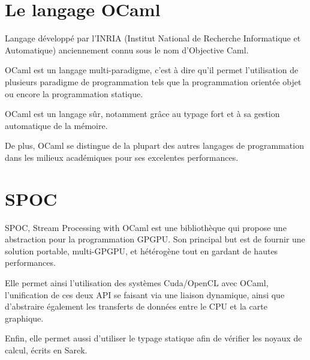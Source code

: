 \documentclass{report}
\begin{document}
\section{Le langage OCaml}
Langage développé par l'INRIA (Institut National de Recherche Informatique et Automatique) anciennement connu sous le nom d'Objective Caml.\newline

OCaml est un langage multi-paradigme, c'est à dire qu'il permet l'utilisation de plusieurs paradigme de programmation tels que la programmation orientée objet ou encore la programmation statique. 

OCaml est un langage sûr, notamment grâce au typage fort et à sa gestion automatique de la mémoire. 

De plus, OCaml se distingue de la plupart des autres langages de programmation dans les milieux académiques pour ses excelentes performances. 

\section{SPOC}
SPOC\cite{refSpoc}, Stream Processing with OCaml est une bibliothèque qui propose une abstraction pour la programmation GPGPU. Son principal but est de fournir une solution portable, multi-GPGPU, et hétérogène tout en gardant de hautes performances.\newline

Elle permet ainsi l’utilisation des systèmes Cuda/OpenCL avec OCaml, l’unification de ces deux API se faisant via une liaison dynamique, ainsi que d’abstraire également les transferts de données entre le CPU et la carte graphique.\newline

Enfin, elle permet aussi d’utiliser le typage statique afin de vérifier les noyaux de calcul, écrits en Sarek.\newline
\end{document}
